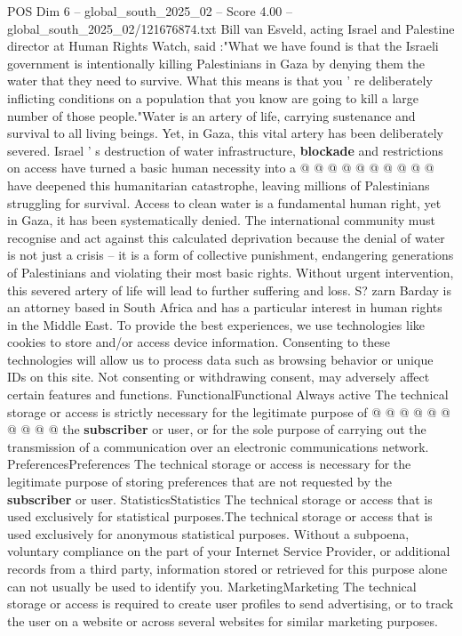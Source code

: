 \begin{textsample}{POS Dim 6 – global\_south\_2025\_02 – Score 4.00 – global\_south\_2025\_02/121676874.txt}
Bill van Esveld, acting Israel and Palestine director at Human Rights Watch, said :"What we have found is that the Israeli government is intentionally killing Palestinians in Gaza by denying them the water that they need to survive.
What this means is that you ' re deliberately inflicting conditions on a population that you know are going to kill a large number of those people."Water is an artery of life, carrying sustenance and survival to all living beings.
Yet, in Gaza, this vital artery has been deliberately severed.
Israel ' s destruction of water infrastructure, \textbf{blockade} and restrictions on access have turned a basic human necessity into a @ @ @ @ @ @ @ @ @ @ have deepened this humanitarian catastrophe, leaving millions of Palestinians struggling for survival.
Access to clean water is a fundamental human right, yet in Gaza, it has been systematically denied.
The international community must recognise and act against this calculated deprivation because the denial of water is not just a crisis -- it is a form of collective punishment, endangering generations of Palestinians and violating their most basic rights.
Without urgent intervention, this severed artery of life will lead to further suffering and loss.
S? zarn Barday is an attorney based in South Africa and has a particular interest in human rights in the Middle East.
To provide the best experiences, we use technologies like cookies to store and/or access device information.
Consenting to these technologies will allow us to process data such as browsing behavior or unique IDs on this site.
Not consenting or withdrawing consent, may adversely affect certain features and functions.
FunctionalFunctional Always active The technical storage or access is strictly necessary for the legitimate purpose of @ @ @ @ @ @ @ @ @ @ the \textbf{subscriber} or user, or for the sole purpose of carrying out the transmission of a communication over an electronic communications network.
PreferencesPreferences The technical storage or access is necessary for the legitimate purpose of storing preferences that are not requested by the \textbf{subscriber} or user.
StatisticsStatistics The technical storage or access that is used exclusively for statistical purposes.The technical storage or access that is used exclusively for anonymous statistical purposes.
Without a subpoena, voluntary compliance on the part of your Internet Service Provider, or additional records from a third party, information stored or retrieved for this purpose alone can not usually be used to identify you.
MarketingMarketing The technical storage or access is required to create user profiles to send advertising, or to track the user on a website or across several websites for similar marketing purposes.

\end{textsample}
